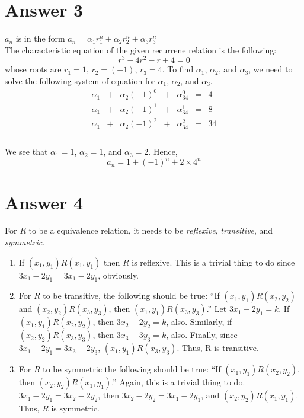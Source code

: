 \documentclass[12pt]{article}
\begin{document}
\section*{Answer 3}
	$a_n$ is in the form $a_n = \alpha_1r_1^n + \alpha_2r_2^n + \alpha_3r_3^n$\\
The characteristic equation of the given recurrene relation is the following: \[r^3 - 4r^2 - r + 4=0\] whose roots are $r_1 = 1$, $r_2 = (-1)$, $r_3 = 4$. To find $\alpha_1$, $\alpha_2$, and $\alpha_3$, we need to solve the following system of equation for $\alpha_1$, $\alpha_2$, and $\alpha_3$.\\

\[
\begin{array}{ccccccc}
	\alpha_1 &+ &\alpha_2(-1)^0 &+& \alpha_34^0&=&4\\
	\alpha_1 &+ &\alpha_2(-1)^1 &+& \alpha_34^1&=&8\\
	\alpha_1 &+ &\alpha_2(-1)^2 &+& \alpha_34^2&=&34\\
\end{array}
\] \\

We see that $\alpha_1=1$, $\alpha_2=1$, and $\alpha_3=2$. Hence, \[a_n = 1 + (-1)^n + 2\times 4^n\]


\section*{Answer 4}
For $R$ to be a equivalence relation, it needs to be \textit{reflexive}, \textit{transitive}, and \textit{symmetric}.\\
	
\begin{enumerate}
	\item{}If $(x_1,y_1)R(x_1,y_1)$ then $R$ is reflexive. This is a trivial thing to do since $3x_1 - 2y_1 = 3x_1 - 2y_1$, obviously.
	\item{}For $R$ to be transitive, the following should be true: ``If $(x_1,y_1)R(x_2,y_2)$ and $(x_2,y_2)R(x_3,y_3)$, then $(x_1,y_1)R(x_3,y_3)$.''
		Let $3x_1 - 2y_1 = k$. If $(x_1,y_1)R(x_2,y_2)$, then $3x_2 - 2y_2 = k$, also. Similarly, if $(x_2,y_2)R(x_3,y_3)$, then $3x_3 - 3y_3=k$, also. Finally, since $3x_1-2y_1 = 3x_3 - 2y_3$, $(x_1,y_1)R(x_3,y_3)$. Thus, R is transitive.
	\item{}For $R$ to be symmetric the following should be true: ``If $(x_1,y_1)R(x_2,y_2)$, then $(x_2,y_2)R(x_1,y_1)$.'' Again, this is a trivial thing to do. $3x_1-2y_1 = 3x_2 - 2y_2$, then $3x_2 - 2y_2 = 3x_1 - 2y_1$, and $(x_2,y_2)R(x_1,y_1)$. Thus, $R$ is symmetric.\\

\end{enumerate}
		
\end{document}
